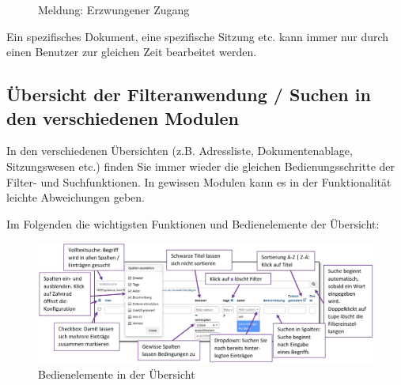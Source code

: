 \begin{figure}[H]
\caption{Meldung: Erzwungener Zugang}
\end{figure}

Ein spezifisches Dokument, eine spezifische Sitzung etc. kann immer nur durch einen Benutzer zur gleichen Zeit bearbeitet werden.

\pagebreak
\subsection{Übersicht der Filteranwendung / Suchen in den verschiedenen Modulen}

In den verschiedenen Übersichten (z.B. Adressliste, Dokumentenablage, Sitzungswesen etc.) finden Sie immer wieder die gleichen Bedienungsschritte der Filter- und Suchfunktionen. In gewissen Modulen kann es in der Funktionalität leichte Abweichungen geben. 

\vspace{\baselineskip}

Im Folgenden die wichtigsten Funktionen und Bedienelemente der Übersicht:

\begin{figure}[H]
\hspace*{-2.3cm}
\includegraphics[width=1.25\linewidth]{../chapters/02_GettingStarted/pictures/uebersicht_Bedienung}
\caption{Bedienelemente in der Übersicht}
\end{figure}



